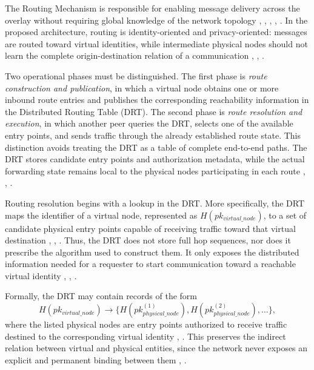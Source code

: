 \documentclass[
  12pt,
  oneside,
  a4paper,
  chapter=TITLE,
  section=TITLE,
  english,
  brazil
]{abntex2}
\begin{document}
The Routing Mechanism is responsible for enabling message delivery across the overlay without requiring global knowledge of the network topology \cite{stoica2001chord}, \cite{maymounkov2002kademlia}, \cite{rowstron2001pastry}, \cite{augustine2022byzantine}, \cite{mirzaei2018pk}. In the proposed architecture, routing is identity-oriented and privacy-oriented: messages are routed toward virtual identities, while intermediate physical nodes should not learn the complete origin-destination relation of a communication \cite{tosic2022spatial}, \cite{mirzaei2018pk}, \cite{qian2016garlic}.

Two operational phases must be distinguished. The first phase is \textit{route construction and publication}, in which a virtual node obtains one or more inbound route entries and publishes the corresponding reachability information in the Distributed Routing Table (DRT). The second phase is \textit{route resolution and execution}, in which another peer queries the DRT, selects one of the available entry points, and sends traffic through the already established route state. This distinction avoids treating the DRT as a table of complete end-to-end paths. The DRT stores candidate entry points and authorization metadata, while the actual forwarding state remains local to the physical nodes participating in each route \cite{li2022unreachable}, \cite{augustine2022byzantine}, \cite{mirzaei2018pk}.

Routing resolution begins with a lookup in the DRT. More specifically, the DRT maps the identifier of a virtual node, represented as $H(pk_{virtual\_node})$, to a set of candidate physical entry points capable of receiving traffic toward that virtual destination \cite{li2022unreachable}, \cite{augustine2022byzantine}, \cite{mirzaei2018pk}. Thus, the DRT does not store full hop sequences, nor does it prescribe the algorithm used to construct them. It only exposes the distributed information needed for a requester to start communication toward a reachable virtual identity \cite{li2022unreachable}, \cite{augustine2022byzantine}, \cite{mirzaei2018pk}.

\thesisdrttikz

Formally, the DRT may contain records of the form
\[
H(pk_{virtual\_node}) \rightarrow \{H(pk_{physical\_node}^{(1)}), H(pk_{physical\_node}^{(2)}), \dots\},
\]
where the listed physical nodes are entry points authorized to receive traffic destined to the corresponding virtual identity \cite{li2022unreachable}, \cite{mirzaei2018pk}. This preserves the indirect relation between virtual and physical entities, since the network never exposes an explicit and permanent binding between them \cite{mirzaei2018pk}, \cite{qian2016garlic}.
\end{document}
